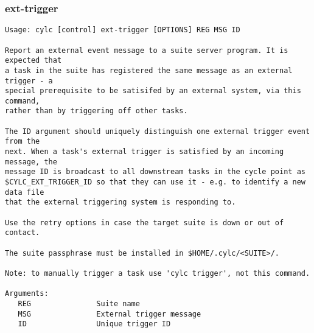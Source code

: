 \subsubsection{ext-trigger}
\label{ext-trigger}
\begin{lstlisting}
Usage: cylc [control] ext-trigger [OPTIONS] REG MSG ID 

Report an external event message to a suite server program. It is expected that
a task in the suite has registered the same message as an external trigger - a
special prerequisite to be satisifed by an external system, via this command,
rather than by triggering off other tasks.

The ID argument should uniquely distinguish one external trigger event from the
next. When a task's external trigger is satisfied by an incoming message, the
message ID is broadcast to all downstream tasks in the cycle point as
$CYLC_EXT_TRIGGER_ID so that they can use it - e.g. to identify a new data file
that the external triggering system is responding to.

Use the retry options in case the target suite is down or out of contact.

The suite passphrase must be installed in $HOME/.cylc/<SUITE>/.

Note: to manually trigger a task use 'cylc trigger', not this command.

Arguments:
   REG               Suite name
   MSG               External trigger message
   ID                Unique trigger ID


\end{lstlisting}
